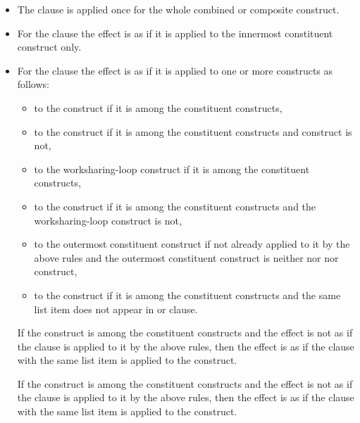 \begin{itemize}
\item The  clause is applied once for the whole combined or composite construct.

\item For the  clause the effect is as if it is applied to the innermost constituent construct only.

\item For the  clause the effect is as if it is applied to one or more
constructs as follows:
\begin{itemize}
\item to the  construct if it is among the constituent constructs,

\item to the  construct if it is among the constituent constructs and  construct is not,

\item to the worksharing-loop construct if it is among the constituent constructs,

\item to the  construct if it is among the constituent
  constructs and the worksharing-loop construct is not,

\item to the outermost constituent construct if not already applied to it by the above
rules and the outermost constituent construct is neither  nor 
nor  construct,

\item to the  construct if it is among the constituent
constructs and the same list item does not appear in  or  clause.
\end{itemize}

If the  construct is among the constituent constructs and the
effect is not as if the  clause is applied to it by the
above rules, then the effect is as if the  clause with the same
list item is applied to the  construct.

If the  construct is among the constituent constructs and the
effect is not as if the  clause is applied to it by the
above rules, then the effect is as if the  clause with the same
list item is applied to the  construct.


\end{itemize}
